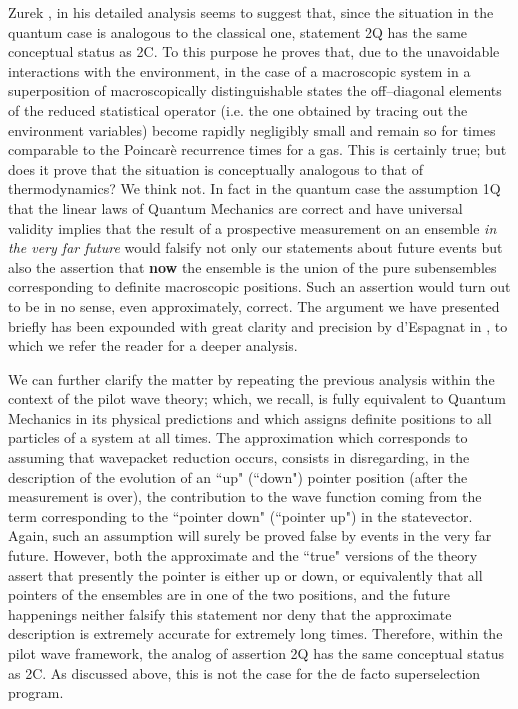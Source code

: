 \documentclass[12pt]{article}
\begin{document}
Zurek \cite{zur1,zu}, in his detailed analysis seems to suggest
that, since the situation in the quantum case is analogous to the
classical one, statement 2Q has the same conceptual status as 2C.
To this purpose he proves that, due to the unavoidable
interactions with the environment, in the case of a macroscopic
system in a superposition of macroscopically distinguishable
states the off--diagonal elements of the reduced statistical
operator (i.e. the one obtained by tracing out the environment
variables) become rapidly negligibly small and remain so for times
comparable to the Poincar\`e recurrence times for a gas. This is
certainly true; but does it prove that the situation is
conceptually analogous to that of thermodynamics? We think not. In
fact in the quantum case the assumption 1Q that the linear laws of
Quantum Mechanics are correct and have universal validity implies
that the result of a prospective measurement on an ensemble {\it
in the very far future} would falsify not only our statements
about future events but also the assertion that {\bf now} the
ensemble is the union of the pure subensembles corresponding to
definite macroscopic positions. Such an assertion would turn out
to be in no sense, even approximately, correct. The argument we
have presented briefly has been expounded with great clarity and
precision by d'Espagnat in \cite{be1}, to which we refer the
reader for a deeper analysis.

We can further clarify the matter by repeating the previous
analysis within the context of the pilot wave theory; which, we
recall, is fully equivalent to Quantum Mechanics in its physical
predictions and which assigns definite positions to all particles
of a system at all times. The approximation which corresponds to
assuming that wavepacket reduction occurs, consists in
disregarding, in the description of the evolution of an ``up"
(``down") pointer position (after the measurement is over), the
contribution to the wave function coming from the term
corresponding to the ``pointer down" (``pointer up") in the
statevector. Again, such an assumption will surely be proved false
by events in the very far future. However, both the approximate
and the ``true" versions of the theory assert that presently the
pointer is either up or down, or equivalently that all pointers of
the ensembles are in one of the two positions, and the future
happenings neither falsify this statement nor deny that the
approximate description is extremely accurate for extremely long
times. Therefore, within the pilot wave framework, the analog of
assertion 2Q has the same conceptual status as 2C. As discussed
above, this is not the case for the de facto superselection
program.
\end{document}
